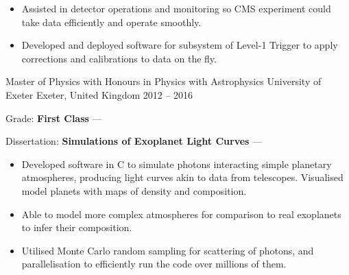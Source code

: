 \begin{cventries}
{\begin{cvitems}
            \vpaddingEduSubpoint
            \begin{itemize}[itemsep=\vPaddingLength, label=\bullet]
                \item{Assisted in detector operations and monitoring so CMS experiment could take data efficiently and operate smoothly.}
                \item{Developed and deployed software for subsystem of Level-1 Trigger to apply corrections and calibrations to data on the fly.}
            \end{itemize}
        \end{cvitems}
        }

    \cventry
        {Master of Physics with Honours in Physics with Astrophysics}
        {University of Exeter}
        {Exeter, United Kingdom}
        {2012 -- 2016}
        {
        \begin{cvitems} %
            \item {Grade: \textbf{First Class} --- }
            \item {Dissertation: \textbf{Simulations of Exoplanet Light Curves} --- }
            \vpaddingEduSubpoint
            \begin{itemize}[itemsep=\vPaddingLength, label=\bullet]
                \item{Developed software in C to simulate photons interacting simple planetary atmospheres, producing light curves akin to data from telescopes. Visualised model planets with maps of density and composition.}
                \item{Able to model more complex atmospheres for comparison to real exoplanets to infer their composition.}
                \item{Utilised Monte Carlo random sampling for scattering of photons, and parallelisation to efficiently run the code over millions of them.}
            \end{itemize}
        \end{cvitems}
        } %


\end{cventries}
